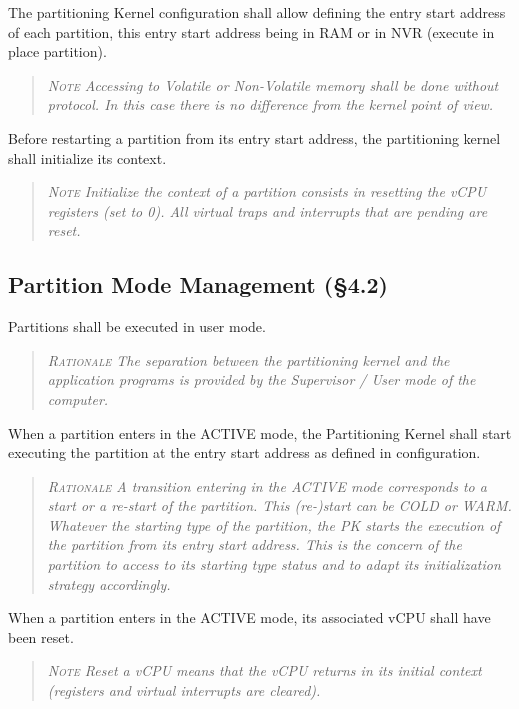 The partitioning Kernel configuration shall allow defining the entry start address of each partition, this entry start address being in RAM or in NVR (execute in place partition).
\begin{quote}\it
\textsc{Note}
Accessing to Volatile or Non-Volatile memory shall be done without protocol. In this case there is no difference from the kernel point of view.
\end{quote}

Before restarting a partition from its entry start address, the partitioning kernel shall initialize its context.
\begin{quote}\it
\textsc{Note}
Initialize the context of a partition consists in resetting the vCPU registers (set to 0). All virtual traps and interrupts that are pending are reset.
\end{quote}

\subsection{Partition Mode Management (\S4.2)}

Partitions shall be executed in user mode.
\begin{quote}\it
\textsc{Rationale}
The separation between the partitioning kernel and the application programs is provided by the Supervisor / User mode of the computer.
\end{quote}

When a partition enters in the ACTIVE mode, the Partitioning Kernel shall start executing the partition at the entry start address as defined in configuration.
\begin{quote}\it
\textsc{Rationale}
A transition entering in the ACTIVE mode corresponds to a start or a re-start of the partition. This (re-)start can be COLD or WARM. Whatever the starting type of the partition, the PK starts the execution of the partition from its entry start address. This is the concern of the partition to access to its starting type status and to adapt its initialization strategy accordingly.
\end{quote}

When a partition enters in the ACTIVE mode,  its associated vCPU shall have been reset.
\begin{quote}\it
\textsc{Note}
Reset a vCPU means that the vCPU returns in its initial context (registers and virtual interrupts are cleared).
\end{quote}

